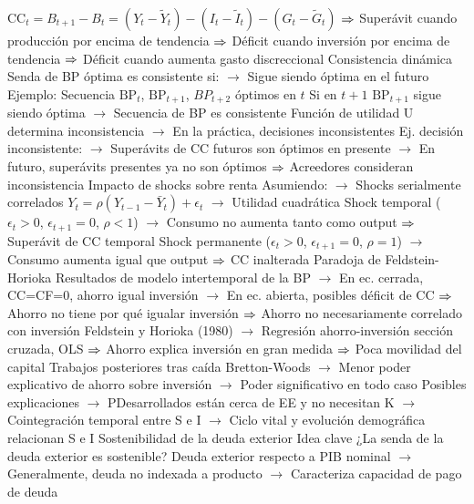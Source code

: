 \documentclass{nuevotema}
\begin{document}
\begin{esquemal}
				\4[] $\text{CC}_t = B_{t+1} - B_t = (Y_t - \tilde{Y}_t) - (I_t - \tilde{I}_t) - (G_t - \tilde{G}_t)$
				\4[] $\Rightarrow$ Superávit cuando producción por encima de tendencia
				\4[] $\Rightarrow$ Déficit cuando inversión por encima de tendencia
				\4[] $\Rightarrow$ Déficit cuando aumenta gasto discreccional
				\4 Consistencia dinámica
				\4[] Senda de BP óptima es consistente si:
				\4[] $\to$ Sigue siendo óptima en el futuro
				\4[] Ejemplo:
				\4[] Secuencia $\text{BP}_t$, $\text{BP}_{t+1}$, $BP_{t+2}$ óptimos en $t$
				\4[] Si en $t+1$ $\text{BP}_{t+1}$ sigue siendo óptima
				\4[] $\to$ Secuencia de BP es consistente
				\4[] Función de utilidad U determina inconsistencia
				\4[] $\to$ En la práctica, decisiones inconsistentes
				\4[] Ej. decisión inconsistente:
				\4[] $\to$ Superávits de CC futuros son óptimos en presente
				\4[] $\to$ En futuro, superávits presentes ya no son óptimos
				\4[] $\Rightarrow$ Acreedores consideran inconsistencia
				\4 Impacto de shocks sobre renta
				\4[] Asumiendo:
				\4[] $\to$ Shocks serialmente correlados $Y_t = \rho(Y_{t-1} - \bar{Y}_t) + \epsilon_t$
				\4[] $\to$ Utilidad cuadrática
				\4[] Shock temporal ($\epsilon_t > 0$, $\epsilon_{t+1} = 0$, $\rho<1$)
				\4[] $\to$ Consumo no aumenta tanto como output
				\4[] $\Rightarrow$ Superávit de CC temporal
				\4[] Shock permanente ($\epsilon_t > 0$, $\epsilon_{t+1} = 0$, $\rho=1$)
				\4[] $\to$ Consumo aumenta igual que output
				\4[] $\Rightarrow$ CC inalterada
				\4 Paradoja de Feldstein-Horioka
				\4[] Resultados de modelo intertemporal de la BP
				\4[] $\to$ En ec. cerrada, CC=CF=0, ahorro igual inversión
				\4[] $\to$ En ec. abierta, posibles déficit de CC
				\4[] $\Rightarrow$ Ahorro no tiene por qué igualar inversión
				\4[] $\Rightarrow$ Ahorro no necesariamente correlado con inversión
				\4[] Feldstein y Horioka (1980)
				\4[] $\to$ Regresión ahorro-inversión sección cruzada, OLS
				\4[] $\Rightarrow$ Ahorro explica inversión en gran medida
				\4[] $\Rightarrow$ Poca movilidad del capital
				\4[] Trabajos posteriores tras caída Bretton-Woods
				\4[] $\to$ Menor poder explicativo de ahorro sobre inversión
				\4[] $\to$ Poder significativo en todo caso
				\4[] Posibles explicaciones
				\4[] $\to$ PDesarrollados están cerca de EE y no necesitan K
				\4[] $\to$ Cointegración temporal entre S e I
				\4[] $\to$ Ciclo vital y evolución demográfica relacionan S e I
		\2 Sostenibilidad de la deuda exterior
			\3 Idea clave
				\4 ¿La senda de la deuda exterior es sostenible?
				\4[] Deuda exterior respecto a PIB nominal
				\4[] $\to$ Generalmente, deuda no indexada a producto
				\4[] $\to$ Caracteriza capacidad de pago de deuda

\end{esquemal}
\end{document}

